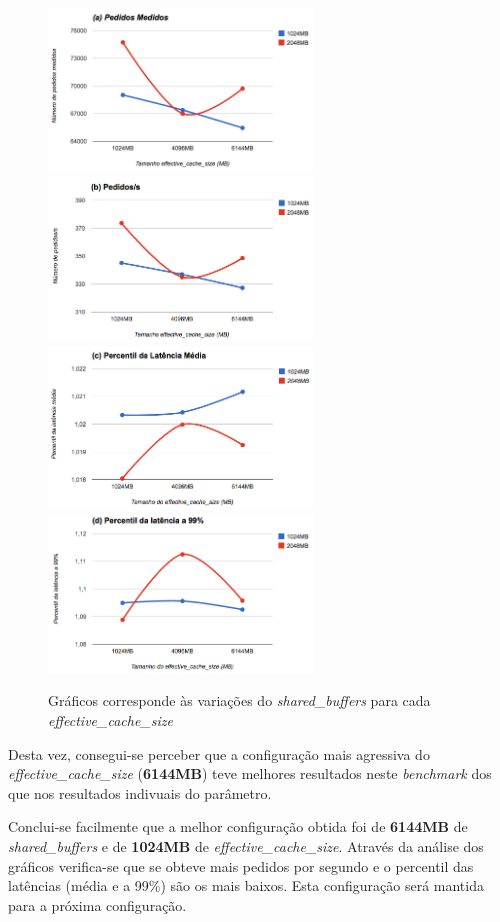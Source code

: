 \begin{figure}[ht!]
\centering
\includegraphics[width=70mm]{img/questao_3/sb_ecs_a.png}
\includegraphics[width=70mm]{img/questao_3/sb_ecs_b.png}
\includegraphics[width=70mm]{img/questao_3/sb_ecs_c.png}
\includegraphics[width=70mm]{img/questao_3/sb_ecs_d.png}
\caption{Gráficos corresponde às variações do \textit{shared\_buffers} para cada \textit{effective\_cache\_size}}
\end{figure}

Desta vez, consegui-se perceber que a configuração mais agressiva do \textit{effective\_cache\_size} (\textbf{6144MB}) teve melhores resultados neste \textit{benchmark} dos que nos resultados indivuais do parâmetro.

Conclui-se facilmente que a melhor configuração obtida foi de \textbf{6144MB}  de \textit{shared\_buffers} e de \textbf{1024MB} de \textit{effective\_cache\_size}. Através da análise dos gráficos verifica-se que se obteve mais pedidos por segundo e o percentil das latências (média e a 99\%) são os mais baixos. Esta configuração será mantida para a próxima configuração.

